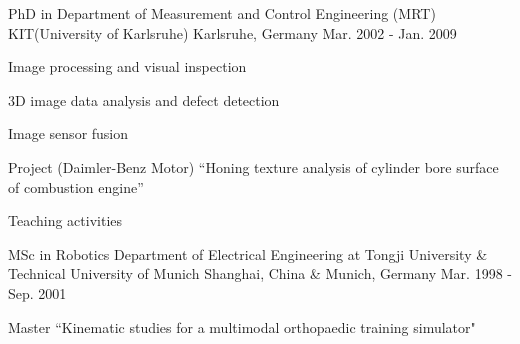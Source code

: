 \documentclass[../cv_xin.tex]{subfiles}
\begin{document}
\begin{cventries}
  \cventry
    {PhD in Department of Measurement and Control Engineering (MRT)} %
    {KIT(University of Karlsruhe)} %
    {Karlsruhe, Germany} %
    {Mar. 2002 - Jan. 2009} %
    {
      \begin{cvitems} %
        \item Image processing and visual inspection
        \item 3D image data analysis and defect detection
        \item Image sensor fusion
        \item Project (Daimler-Benz Motor) ``Honing texture analysis of cylinder bore surface of combustion engine''
        \item Teaching activities
      \end{cvitems}
    }

  \cventry
    {MSc in Robotics} %
    {Department of Electrical Engineering at Tongji University \& Technical University of Munich} %
    {Shanghai, China \& Munich, Germany} %
    {Mar. 1998 - Sep. 2001} %
    {
      \begin{cvitems} %
        \item  Master ``Kinematic studies for a multimodal orthopaedic training simulator"
      \end{cvitems}
    }

\end{cventries}
\end{document}
